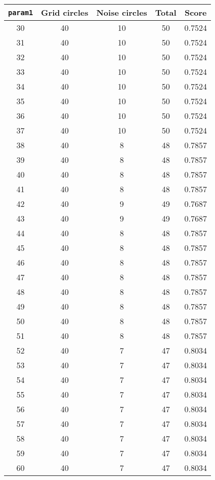 \documentclass[letterpaper, 12pt]{article}
\begin{document}
\begin{longtable}{|c|c|c|c|c|}
\hline
\textbf{\texttt{param1}} & \textbf{Grid circles} & \textbf{Noise circles} & \textbf{Total} & \textbf{Score} \\
\hline
30 & 40 & 10 & 50 & 0.7524 \\
\hline
31 & 40 & 10 & 50 & 0.7524 \\
\hline
32 & 40 & 10 & 50 & 0.7524 \\
\hline
33 & 40 & 10 & 50 & 0.7524 \\
\hline
34 & 40 & 10 & 50 & 0.7524 \\
\hline
35 & 40 & 10 & 50 & 0.7524 \\
\hline
36 & 40 & 10 & 50 & 0.7524 \\
\hline
37 & 40 & 10 & 50 & 0.7524 \\
\hline
38 & 40 & 8 & 48 & 0.7857 \\
\hline
39 & 40 & 8 & 48 & 0.7857 \\
\hline
40 & 40 & 8 & 48 & 0.7857 \\
\hline
41 & 40 & 8 & 48 & 0.7857 \\
\hline
42 & 40 & 9 & 49 & 0.7687 \\
\hline
43 & 40 & 9 & 49 & 0.7687 \\
\hline
44 & 40 & 8 & 48 & 0.7857 \\
\hline
45 & 40 & 8 & 48 & 0.7857 \\
\hline
46 & 40 & 8 & 48 & 0.7857 \\
\hline
47 & 40 & 8 & 48 & 0.7857 \\
\hline
48 & 40 & 8 & 48 & 0.7857 \\
\hline
49 & 40 & 8 & 48 & 0.7857 \\
\hline
50 & 40 & 8 & 48 & 0.7857 \\
\hline
51 & 40 & 8 & 48 & 0.7857 \\
\hline
52 & 40 & 7 & 47 & 0.8034 \\
\hline
53 & 40 & 7 & 47 & 0.8034 \\
\hline
54 & 40 & 7 & 47 & 0.8034 \\
\hline
55 & 40 & 7 & 47 & 0.8034 \\
\hline
56 & 40 & 7 & 47 & 0.8034 \\
\hline
57 & 40 & 7 & 47 & 0.8034 \\
\hline
58 & 40 & 7 & 47 & 0.8034 \\
\hline
59 & 40 & 7 & 47 & 0.8034 \\
\hline
60 & 40 & 7 & 47 & 0.8034 \\
\hline

\end{longtable}
\end{document}
